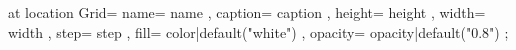 \pic[shift={ {{- offset -}} }] at {{ location }} {
    Grid={
        name={{ name }},
        caption={{ caption }},
        height={{ height }},
        width={{ width }},
        step={{ step }},
        fill={{ color|default("white") }},
        opacity={{ opacity|default("0.8") }}
    }
};
